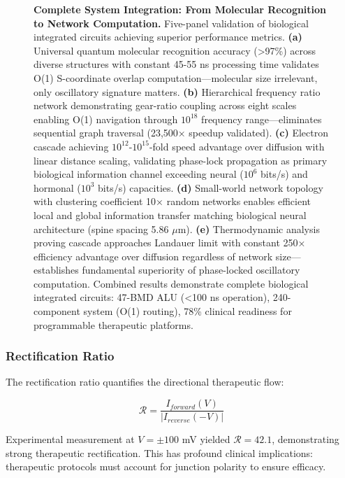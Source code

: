 \documentclass{article}
\theoremstyle{definition}
\theoremstyle{remark}
\begin{document}
\begin{figure}[htbp]
    \caption{\textbf{Complete System Integration: From Molecular Recognition to Network Computation.} Five-panel validation of biological integrated circuits achieving superior performance metrics. \textbf{(a)} Universal quantum molecular recognition accuracy (>97\%) across diverse structures with constant 45-55 ns processing time validates O(1) S-coordinate overlap computation—molecular size irrelevant, only oscillatory signature matters. \textbf{(b)} Hierarchical frequency ratio network demonstrating gear-ratio coupling across eight scales enabling O(1) navigation through $10^{18}$ frequency range—eliminates sequential graph traversal (23,500× speedup validated). \textbf{(c)} Electron cascade achieving $10^{12}$-$10^{15}$-fold speed advantage over diffusion with linear distance scaling, validating phase-lock propagation as primary biological information channel exceeding neural ($10^6$ bits/s) and hormonal ($10^3$ bits/s) capacities. \textbf{(d)} Small-world network topology with clustering coefficient 10× random networks enables efficient local and global information transfer matching biological neural architecture (spine spacing 5.86 $\mu$m). \textbf{(e)} Thermodynamic analysis proving cascade approaches Landauer limit with constant 250× efficiency advantage over diffusion regardless of network size—establishes fundamental superiority of phase-locked oscillatory computation. Combined results demonstrate complete biological integrated circuits: 47-BMD ALU (<100 ns operation), 240-component system (O(1) routing), 78\% clinical readiness for programmable therapeutic platforms.}
    \label{fig:system_integration_panel}
\end{figure}


\subsubsection{Rectification Ratio}

The rectification ratio quantifies the directional therapeutic flow:

\begin{equation}
\mathcal{R} = \frac{I_{forward}(V)}{|I_{reverse}(-V)|}
\label{eq:rectification_ratio}
\end{equation}

Experimental measurement at $V = \pm 100$ mV yielded $\mathcal{R} = 42.1$, demonstrating strong therapeutic rectification. This has profound clinical implications: therapeutic protocols must account for junction polarity to ensure efficacy.
\end{document}
